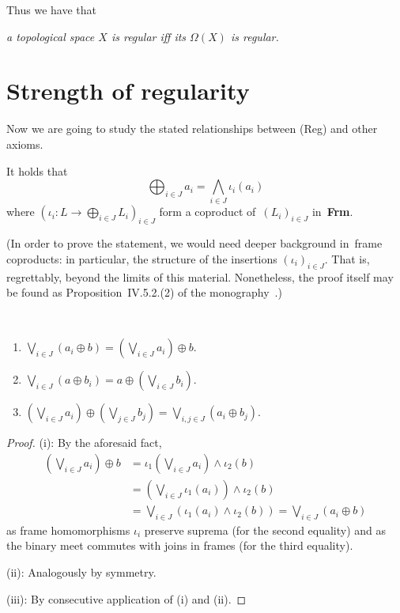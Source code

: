 Thus we have that
\begin{center} 
  \emph{a topological space $X$ is regular iff its $\Omega(X)$ is regular.\/}
\end{center}

\section{Strength of regularity}

Now we are going to study the stated relationships between (Reg) and other
axioms.

\begin{fact}
  It holds that
  \[
    \bigoplus_{i\in J} a_i = \bigwedge_{i\in J} \iota_i(a_i)
  \]
  where $(\iota_i\colon L \to \bigoplus_{i\in J} L_i)_{i\in J}$ form a
  coproduct of~$(L_i)_{i\in J}$ in~{\bf Frm}.
\end{fact}
(In order to prove the statement, we would need deeper background in~frame
coproducts:
in particular, the structure of the insertions $(\iota_i)_{i\in J}$.
That is, regrettably, beyond the limits of this material.
Nonetheless, the proof itself may be found as Proposition~IV.5.2.(2) of the
monography~\cite{picado-pultr12}.)

\begin{lem} \label{oplus-vee-distrib}
  ~
  \begin{enumerate}
  \item $\bigvee_{i\in J} \left(a_i \oplus b\right) = \left(\bigvee_{i\in J}
    a_i \right) \oplus b$.
  \item $\bigvee_{i\in J} \left(a \oplus b_i\right) = a \oplus
    \left(\bigvee_{i\in J} b_i \right)$.
  \item $\left(\bigvee_{i\in J} a_i\right) \oplus \left(\bigvee_{j\in J}
    b_j\right) = \bigvee_{i, j\in J} \left(a_i \oplus b_j\right)$.
  \end{enumerate}
\end{lem}
\begin{proof}
  (i):
  By the aforesaid fact,
  \begin{align*}
    \left(\bigvee_{i\in J} a_i \right) \oplus b
    &= \iota_1\left(\bigvee_{i\in J} a_i \right) \wedge \iota_2(b) \\
    &= \left(\bigvee_{i\in J} \iota_1(a_i) \right) \wedge \iota_2(b) \\
    &= \bigvee_{i\in J} \left(\iota_1(a_i) \wedge \iota_2(b) \right)
    = \bigvee_{i\in J} \left(a_i \oplus b\right)
  \end{align*}
  as frame homomorphisms $\iota_i$ preserve suprema (for the second equality)
  and as the binary meet commutes with joins in frames (for the third
  equality).

  (ii):
  Analogously by symmetry.

  (iii):
  By consecutive application of (i) and (ii).
\end{proof}

